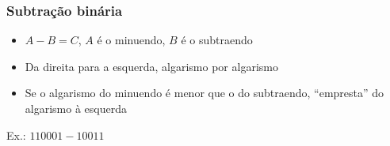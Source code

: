 \documentclass{beamer}
\begin{document}
\begin{frame}
\frametitle{Subtração binária}

\begin{itemize}
\item $A - B = C$, $A$ é o minuendo, $B$ é o subtraendo
\item Da direita para a esquerda, algarismo por algarismo
\item Se o algarismo do minuendo é menor que o do subtraendo, ``empresta'' do algarismo à esquerda
\end{itemize}

Ex.: $110001 - 10011$\\[6pt]

%
%
%
%

\end{frame}
\end{document}
